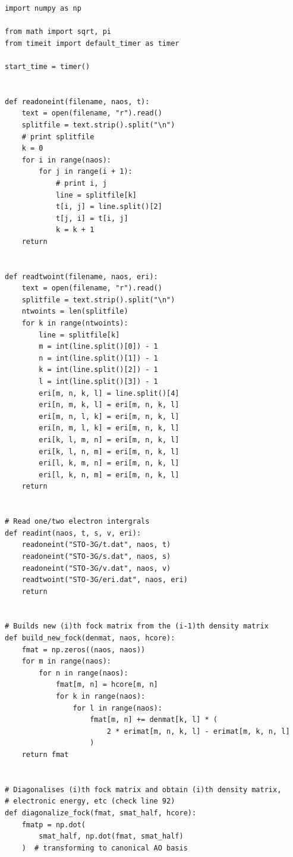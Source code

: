 \vspace{5pt}

\begin{lstlisting}[style=MyPython]
import numpy as np

from math import sqrt, pi
from timeit import default_timer as timer

start_time = timer()


def readoneint(filename, naos, t):
    text = open(filename, "r").read()
    splitfile = text.strip().split("\n")
    # print splitfile
    k = 0
    for i in range(naos):
        for j in range(i + 1):
            # print i, j
            line = splitfile[k]
            t[i, j] = line.split()[2]
            t[j, i] = t[i, j]
            k = k + 1
    return


def readtwoint(filename, naos, eri):
    text = open(filename, "r").read()
    splitfile = text.strip().split("\n")
    ntwoints = len(splitfile)
    for k in range(ntwoints):
        line = splitfile[k]
        m = int(line.split()[0]) - 1
        n = int(line.split()[1]) - 1
        k = int(line.split()[2]) - 1
        l = int(line.split()[3]) - 1
        eri[m, n, k, l] = line.split()[4]
        eri[n, m, k, l] = eri[m, n, k, l]
        eri[m, n, l, k] = eri[m, n, k, l]
        eri[n, m, l, k] = eri[m, n, k, l]
        eri[k, l, m, n] = eri[m, n, k, l]
        eri[k, l, n, m] = eri[m, n, k, l]
        eri[l, k, m, n] = eri[m, n, k, l]
        eri[l, k, n, m] = eri[m, n, k, l]
    return


# Read one/two electron intergrals
def readint(naos, t, s, v, eri):
    readoneint("STO-3G/t.dat", naos, t)
    readoneint("STO-3G/s.dat", naos, s)
    readoneint("STO-3G/v.dat", naos, v)
    readtwoint("STO-3G/eri.dat", naos, eri)
    return


# Builds new (i)th fock matrix from the (i-1)th density matrix
def build_new_fock(denmat, naos, hcore):
    fmat = np.zeros((naos, naos))
    for m in range(naos):
        for n in range(naos):
            fmat[m, n] = hcore[m, n]
            for k in range(naos):
                for l in range(naos):
                    fmat[m, n] += denmat[k, l] * (
                        2 * erimat[m, n, k, l] - erimat[m, k, n, l]
                    )
    return fmat


# Diagonalises (i)th fock matrix and obtain (i)th density matrix,
# electronic energy, etc (check line 92)
def diagonalize_fock(fmat, smat_half, hcore):
    fmatp = np.dot(
        smat_half, np.dot(fmat, smat_half)
    )  # transforming to canonical AO basis


\end{lstlisting}
